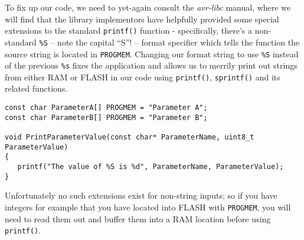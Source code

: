 \documentclass[a4paper,oneside,notitlepage]{book}
\begin{document}
To fix up our code, we need to yet-again consult the \textit{avr-libc} manual, where we will find that the library implementors have helpfully provided some special extensions to the standard \lstinline{printf()} function - specifically, there's a non-standard \lstinline{%S} -- note the capital ``S''! -- format specifier which tells the function the source string is located in \lstinline{PROGMEM}. Changing our format string to use \lstinline{%S} instead of the previous \lstinline{%s} fixes the application and allows us to merrily print out strings from either RAM or FLASH in our code using \lstinline{printf()}, \lstinline{sprintf()} and its related functions.

\begin{center}
\begin{lstlisting}
const char ParameterA[] PROGMEM = "Parameter A";
const char ParameterB[] PROGMEM = "Parameter B";

void PrintParameterValue(const char* ParameterName, uint8_t ParameterValue)
{
   printf("The value of %S is %d", ParameterName, ParameterValue);
}
\end{lstlisting}
\end{center}

Unfortunately no such extensions exist for non-string inputs; so if you have integers for example that you have located into FLASH with \lstinline{PROGMEM}, you will need to read them out and buffer them into a RAM location before using \lstinline{printf()}.
\end{document}
